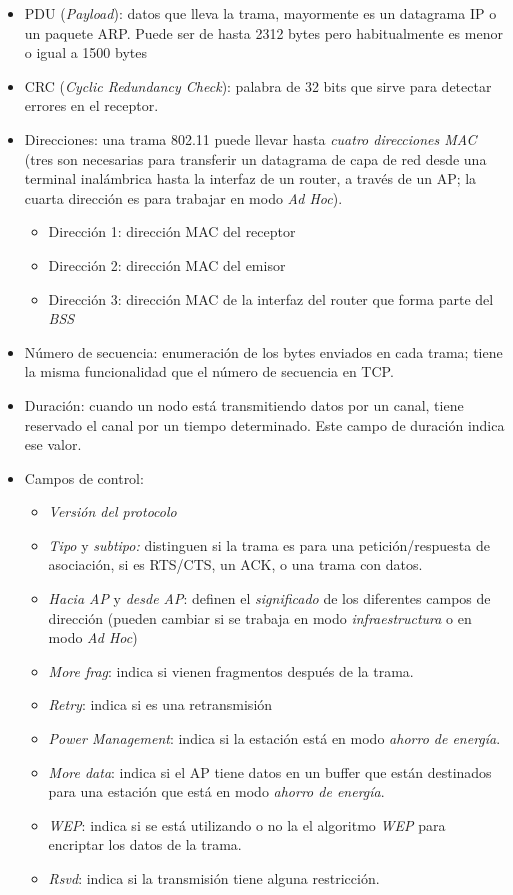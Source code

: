 \begin{itemize}
    \item PDU (\emph{Payload}): datos que lleva la trama, mayormente es un datagrama IP o un paquete ARP. Puede ser de hasta 2312 bytes pero habitualmente es menor o igual a 1500 bytes
    \item CRC (\emph{Cyclic Redundancy Check}): palabra de 32 bits que sirve para detectar errores en el receptor.
    \item Direcciones: una trama 802.11 puede llevar hasta \emph{cuatro direcciones MAC} (tres son necesarias para transferir un datagrama de capa de red desde una terminal inalámbrica hasta la interfaz de un router, a través de un AP; la cuarta dirección es para trabajar en modo \emph{Ad Hoc}).
    \begin{itemize}
        \item Dirección 1: dirección MAC del receptor
        \item Dirección 2: dirección MAC del emisor
        \item Dirección 3: dirección MAC de la interfaz del router que forma parte del \emph{BSS} 
    \end{itemize}
    \item Número de secuencia: enumeración de los bytes enviados en cada trama; tiene la misma funcionalidad que el número de secuencia en TCP.
    \item Duración: cuando un nodo está transmitiendo datos por un canal, tiene reservado el canal por un tiempo determinado. Este campo de duración indica ese valor.
    \item Campos de control:
    \begin{itemize}
        \item \emph{Versión del protocolo}
        \item \emph{Tipo} y \emph{subtipo:} distinguen si la trama es para una petición/respuesta de asociación, si es RTS/CTS, un ACK, o una trama con datos.
        \item \emph{Hacia AP} y \emph{desde AP}: definen el \emph{significado} de los diferentes campos de dirección (pueden cambiar si se trabaja en modo \emph{infraestructura} o en modo \emph{Ad Hoc})
        \item \emph{More frag}: indica si vienen fragmentos después de la trama. 
        \item \emph{Retry}: indica si es una retransmisión 
        \item \emph{Power Management}: indica si la estación está en modo \emph{ahorro de energía}.  
        \item \emph{More data}: indica si el AP tiene datos en un buffer que están destinados para una estación que está en modo \emph{ahorro de energía}.  
        \item \emph{WEP}: indica si se está utilizando o no la el algoritmo \emph{WEP} para encriptar los datos de la trama.
        \item \emph{Rsvd}: indica si la transmisión tiene alguna restricción. 
    \end{itemize}

\end{itemize}
